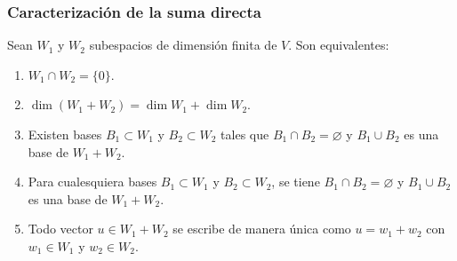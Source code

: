 \begin{frame}
    \frametitle{Caracterización de la suma directa}

    \begin{theorem}
        Sean $W_1$ y $W_2$ subespacios de dimensión finita de $V$. Son
        equivalentes:
        \begin{enumerate}[(1)]
            \item $W_1\cap W_2=\{0\}$.
            \item $\dim(W_1+W_2)=\dim W_1+\dim W_2$.
            \item Existen bases $B_1\subset W_1$ y $B_2\subset W_2$ tales que $B_1\cap B_2=\varnothing$ y $B_1\cup B_2$ es una base de
            $W_1+W_2$.
            \item Para cualesquiera bases $B_1\subset W_1$ y $B_2\subset W_2$,
            se tiene $B_1\cap B_2=\varnothing$ y $B_1\cup B_2$ es una base
            de $W_1+W_2$.
            \item Todo vector $u\in W_1+W_2$ se escribe de manera
            \alert{única} como $u=w_1+w_2$ con $w_1\in W_1$ y $w_2\in W_2$.
        \end{enumerate}
    \end{theorem}
\end{frame}


